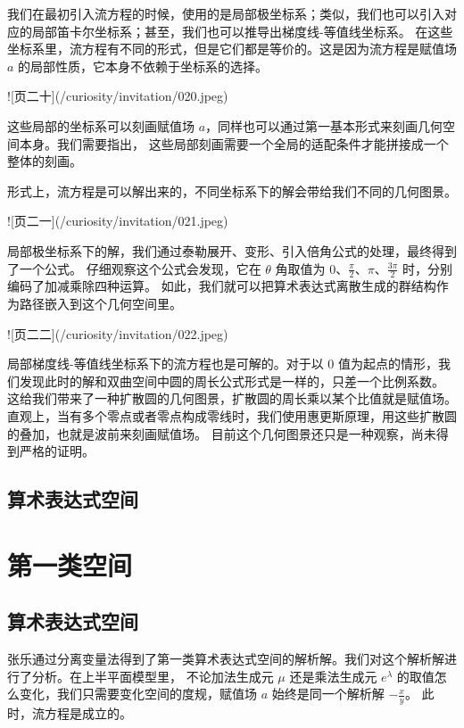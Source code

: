 \documentclass[a4paper,12pt]{book}
\numberwithin{problem}{section}
\numberwithin{definition}{section}
\numberwithin{lemma}{section}
\numberwithin{proposition}{section}
\numberwithin{theorem}{section}
\numberwithin{grammar}{section}
\numberwithin{program}{section}
\numberwithin{convention}{section}
\numberwithin{corollary}{section}
\begin{document}
我们在最初引入流方程的时候，使用的是局部极坐标系；类似，我们也可以引入对应的局部笛卡尔坐标系；甚至，我们也可以推导出梯度线-等值线坐标系。
在这些坐标系里，流方程有不同的形式，但是它们都是等价的。这是因为流方程是赋值场 $a$ 的局部性质，它本身不依赖于坐标系的选择。

![页二十](/curiosity/invitation/020.jpeg)

这些局部的坐标系可以刻画赋值场 $a$，同样也可以通过第一基本形式来刻画几何空间本身。我们需要指出，
这些局部刻画需要一个全局的适配条件才能拼接成一个整体的刻画。

形式上，流方程是可以解出来的，不同坐标系下的解会带给我们不同的几何图景。

![页二一](/curiosity/invitation/021.jpeg)

局部极坐标系下的解，我们通过泰勒展开、变形、引入倍角公式的处理，最终得到了一个公式。
仔细观察这个公式会发现，它在 $\theta$ 角取值为 $0$、$\frac{\pi}{2}$、$\pi$、$\frac{3\pi}{2}$ 时，分别编码了加减乘除四种运算。
如此，我们就可以把算术表达式离散生成的群结构作为路径嵌入到这个几何空间里。

![页二二](/curiosity/invitation/022.jpeg)

局部梯度线-等值线坐标系下的流方程也是可解的。对于以 $0$ 值为起点的情形，我们发现此时的解和双曲空间中圆的周长公式形式是一样的，只差一个比例系数。
这给我们带来了一种扩散圆的几何图景，扩散圆的周长乘以某个比值就是赋值场。
直观上，当有多个零点或者零点构成零线时，我们使用惠更斯原理，用这些扩散圆的叠加，也就是波前来刻画赋值场。
目前这个几何图景还只是一种观察，尚未得到严格的证明。

\section{算术表达式空间}

\newpage

\chapter{第一类空间}

\section{算术表达式空间}

张乐通过分离变量法得到了第一类算术表达式空间的解析解。我们对这个解析解进行了分析。在上半平面模型里，
不论加法生成元 $\mu$ 还是乘法生成元 $e^\lambda$ 的取值怎么变化，我们只需要变化空间的度规，赋值场 $a$ 始终是同一个解析解 $-\frac{x}{y}$。
此时，流方程是成立的。
\end{document}

